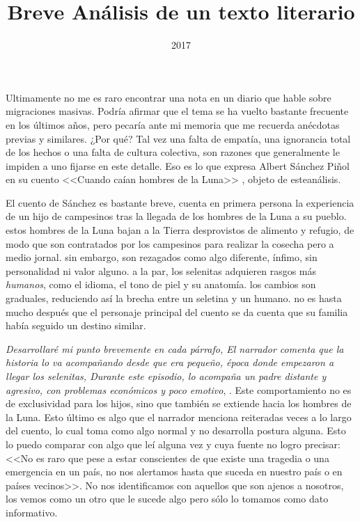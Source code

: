 \documentclass[a3paper]{tufte-handout}
\title{Breve Análisis de un texto literario}
\date{2017}
\begin{document}
\maketitle




{ \color{green}Ultimamente no me es raro encontrar una nota en un diario que hable sobre migraciones masivas. Podría afirmar que el tema se ha vuelto bastante frecuente en los últimos años, pero pecaría ante mi memoria que me recuerda anécdotas previas y similares. ¿Por qué? Tal vez una falta de empatía, una ignorancia total de los hechos o una falta de cultura colectiva, son razones que generalmente le impiden a uno fijarse en este detalle. Eso es lo que expresa Albert Sánchez Piñol en su cuento <<Cuando caían hombres de la Luna>> \cite{Albert}, objeto de esteanálisis. }

\begin{flushright}
 El cuento de Sánchez es bastante breve, cuenta en primera persona la experiencia de un hijo de campesinos tras la llegada de los hombres de la Luna a su pueblo. estos hombres de la Luna bajan a la Tierra desprovistos de alimento y refugio, de modo que son contratados por los campesinos para realizar la cosecha pero a medio jornal. sin embargo, son rezagados como algo diferente, ínfimo, sin personalidad ni valor alguno. a la par, los selenitas adquieren rasgos más \emph{humanos}, como el idioma, el tono de piel y su anatomía. los cambios son graduales, reduciendo así la brecha entre un seletina y un humano. no es hasta mucho después que el personaje principal del cuento se da cuenta que su familia había seguido un destino similar.

\end{flushright}

\emph{Desarrollaré mi punto brevemente en cada párrafo, \color{red} El narrador comenta que la historia lo va acompañando desde que era pequeño, época donde empezaron a llegar los selenitas,\color{blue} Durante este episodio, lo acompaña un padre distante y agresivo, con problemas económicos y poco emotivo}, {\color {green}. Este comportamiento no es de exclusividad para los hijos, sino que también se extiende hacia los hombres de la Luna. Esto último es algo que el narrador menciona reiteradas veces a lo largo del cuento, lo cual toma como algo normal y no desarrolla postura alguna. Esto lo puedo comparar con algo que leí alguna vez y cuya fuente no logro precisar: <<No es raro que pese a estar conscientes de que existe una tragedia o una emergencia en un país, no nos alertamos hasta que suceda en nuestro país o en países vecinos>>.}
  No nos identificamos con aquellos que son ajenos a nosotros, los vemos como un otro que le sucede algo pero sólo lo tomamos como dato informativo.
  
\end{document}
